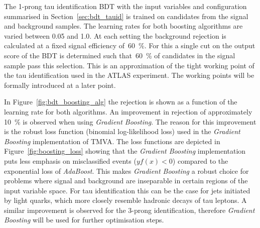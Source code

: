 The 1-prong tau identification BDT with the input variables and configuration
summarised in Section~\ref{sec:bdt_tauid} is trained on \tauhadvis candidates
from the signal and background samples. The learning rates for both boosting
algorithms are varied between 0.05 and 1.0. At each setting the background
rejection is calculated at a fixed signal efficiency of~\SI{60}{\percent}. For
this a single cut on the output score of the BDT is determined such
that~\SI{60}{\percent} of \tauhadvis candidates in the signal sample pass this
selection. This is an approximation of the tight working point of the tau
identification used in the ATLAS experiment. The working points will be formally
introduced at a later point.

In Figure~\ref{fig:bdt_boosting_alg} the rejection is shown as a function of the
learning rate for both algorithms. An improvement in rejection of approximately
\SI{10}{\percent} is observed when using \emph{Gradient Boosting}. The reason
for this improvement is the robust loss function (binomial log-likelihood loss)
used in the \emph{Gradient Boosting} implementation of TMVA. The loss functions
are depicted in Figure~\ref{fig:boosting_loss} showing that the \emph{Gradient
  Boosting} implementation puts less emphasis on misclassified events
($y f(x) < 0$) compared to the exponential loss of \emph{AdaBoost}. This makes
\emph{Gradient Boosting} a robust choice for problems where signal and
background are inseparable in certain regions of the input variable space. For
tau identification this can be the case for jets initiated by light quarks,
which more closely resemble hadronic decays of tau leptons. A similar
improvement is observed for the 3-prong identification, therefore \emph{Gradient
  Boosting} will be used for further optimisation steps.

